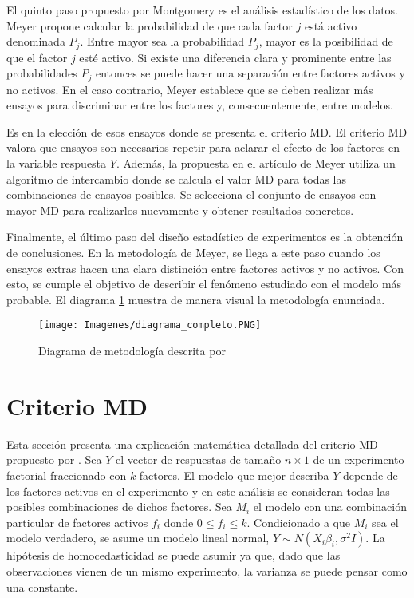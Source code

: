 El quinto paso propuesto por Montgomery es el análisis estadístico de los datos. Meyer propone calcular la probabilidad de que cada factor $j$ está activo denominada $P_j$. Entre mayor sea la probabilidad $P_j$, mayor es la posibilidad de que el factor $j$ esté activo. Si existe una diferencia clara y prominente entre las probabilidades $P_j$ entonces se puede hacer una separación entre factores activos y no activos. En el caso contrario, Meyer establece que se deben realizar más ensayos para discriminar entre los factores y, consecuentemente, entre modelos. 

Es en la elección de esos ensayos donde se presenta el criterio MD. El criterio MD valora que ensayos son necesarios repetir para aclarar el efecto de los factores en la variable respuesta $Y$. Además, la propuesta en el artículo de Meyer utiliza un algoritmo de intercambio donde se calcula el valor MD para todas las combinaciones de ensayos posibles. Se selecciona el conjunto de ensayos con mayor MD para realizarlos nuevamente y obtener resultados concretos. 

Finalmente, el último paso del diseño estadístico de experimentos es la obtención de conclusiones. En la metodología de Meyer, se llega a este paso cuando los ensayos extras hacen una clara distinción entre factores activos y no activos. Con esto, se cumple el objetivo de describir el fenómeno estudiado con el modelo más probable. El diagrama \ref{diagrama_completo} muestra de manera visual la metodología enunciada. 

\begin{figure}[h]
	\begin{center}
		\texttt{[image: Imagenes/diagrama\_completo.PNG]}
		\caption{Diagrama de metodología descrita por \cite{meyer1996}}
		\label{diagrama_completo}
	\end{center}
\end{figure} 



\section{Criterio MD} \label{seccion_criterioMD}

Esta sección presenta una explicación matemática detallada del criterio MD propuesto por \cite{meyer1996}. Sea \textbf{$Y$} el vector de respuestas de tamaño $n \times 1$ de un experimento factorial fraccionado con $k$ factores. El modelo que mejor describa \textbf{$Y$} depende de los factores activos en el experimento y en este análisis se consideran todas las posibles combinaciones de dichos factores. Sea $M_i$ el modelo con una combinación particular de factores activos $f_i$ donde $0 \leq f_i \leq k$. Condicionado a que $M_i$ sea el modelo verdadero, se asume un modelo lineal normal, $\textbf{$Y$} \sim N(X_i \beta_i, \sigma^2 I).$ La hipótesis de homocedasticidad se puede asumir ya que, dado que las observaciones vienen de un mismo experimento, la varianza se puede pensar como una constante.

